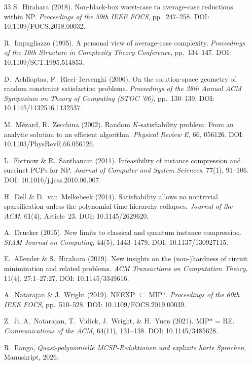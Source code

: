 \documentclass[aps,prd,twocolumn,superscriptaddress,nofootinbib]{revtex4-2}
\theoremstyle{definition}
\theoremstyle{remark}
\begin{document}
\begin{thebibliography}{33}
S.~Hirahara (2018).
Non-black-box worst-case to average-case reductions within NP.
\textit{Proceedings of the 59th IEEE FOCS}, pp.\ 247--258.
DOI: 10.1109/FOCS.2018.00032.

R.~Impagliazzo (1995).
A personal view of average-case complexity.
\textit{Proceedings of the 10th Structure in Complexity Theory Conference}, pp.\ 134--147.
DOI: 10.1109/SCT.1995.514853.

D.~Achlioptas, F.~Ricci-Tersenghi (2006).
On the solution-space geometry of random constraint satisfaction problems.
\textit{Proceedings of the 38th Annual ACM Symposium on Theory of Computing (STOC '06)}, pp.\ 130--139.
DOI: 10.1145/1132516.1132537.

M.~M\'ezard, R.~Zecchina (2002).
Random $K$-satisfiability problem: From an analytic solution to an efficient algorithm.
\textit{Physical Review E}, 66, 056126.
DOI: 10.1103/PhysRevE.66.056126.

L.~Fortnow \& R.~Santhanam (2011).
Infeasibility of instance compression and succinct PCPs for NP.
\textit{Journal of Computer and System Sciences}, 77(1), 91--106.
DOI: 10.1016/j.jcss.2010.06.007.

H.~Dell \& D.~van~Melkebeek (2014).
Satisfiability allows no nontrivial sparsification unless the polynomial-time hierarchy collapses.
\textit{Journal of the ACM}, 61(4), Article~23.
DOI: 10.1145/2629620.

A.~Drucker (2015).
New limits to classical and quantum instance compression.
\textit{SIAM Journal on Computing}, 44(5), 1443--1479.
DOI: 10.1137/130927115.

E.~Allender \& S.~Hirahara (2019).
New insights on the (non-)hardness of circuit minimization and related problems.
\textit{ACM Transactions on Computation Theory}, 11(4), 27:1--27:27.
DOI: 10.1145/3349616.

A.~Natarajan \& J.~Wright (2019).
NEEXP $\subseteq$ MIP*.
\textit{Proceedings of the 60th IEEE FOCS}, pp.\ 510--528.
DOI: 10.1109/FOCS.2019.00039.

Z.~Ji, A.~Natarajan, T.~Vidick, J.~Wright, \& H.~Yuen (2021).
MIP* = RE.
\textit{Communications of the ACM}, 64(11), 131--138.
DOI: 10.1145/3485628.

R.~Ilango, \textit{Quasi-polynomielle MCSP-Reduktionen und explizite harte Sprachen}, Manuskript, 2026.

\end{thebibliography}
\end{document}
